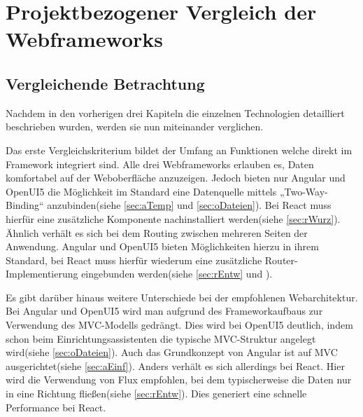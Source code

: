 

\chapter{Projektbezogener Vergleich der Webframeworks}
\section{Vergleichende Betrachtung}\label{sec:vergl}

Nachdem in den vorherigen drei Kapiteln die einzelnen Technologien detailliert beschrieben wurden, werden sie nun miteinander verglichen.

Das erste Vergleichskriterium bildet der Umfang an Funktionen welche direkt im Framework integriert sind. Alle drei Webframeworks erlauben es, Daten komfortabel auf der Weboberfläche anzuzeigen. Jedoch bieten nur Angular und OpenUI5 die Möglichkeit im Standard eine Datenquelle mittels „Two-Way-Binding“ anzubinden(siehe \autoref{sec:aTemp} und \autoref{sec:oDateien}). Bei React muss hierfür eine zusätzliche Komponente nachinstalliert werden(siehe \autoref{sec:rWurz}). Ähnlich verhält es sich bei dem Routing zwischen mehreren Seiten der Anwendung. Angular und OpenUI5 bieten Möglichkeiten hierzu in ihrem Standard, bei React muss hierfür wiederum eine zusätzliche Router-Implementierung eingebunden werden(siehe \autoref{sec:rEntw} und \autocites[vgl.][8]{Zeigermann.2016}). 

Es gibt darüber hinaus weitere Unterschiede bei der empfohlenen Webarchitektur. Bei Angular und OpenUI5 wird man aufgrund des Frameworkaufbaus zur Verwendung des MVC-Modells gedrängt. Dies wird bei OpenUI5 deutlich, indem schon beim Einrichtungsassistenten die typische MVC-Struktur angelegt wird(siehe \autoref{sec:oDateien}). Auch das Grundkonzept von Angular ist auf MVC ausgerichtet(siehe \autoref{sec:aEinf}). Anders verhält es sich allerdings bei React. Hier wird die Verwendung von Flux empfohlen, bei dem typischerweise die Daten nur in eine Richtung fließen(siehe \autoref{sec:rEntw}). Dies generiert eine schnelle Performance bei React.

